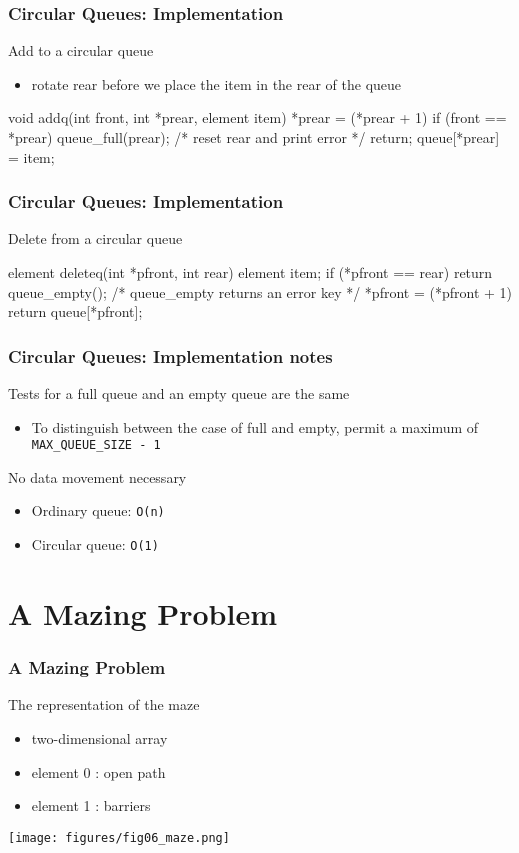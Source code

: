 \documentclass[newPxFont,sthlmFooter,nooffset]{beamer}
\begin{document}
\begin{frame}[t, fragile]
  \frametitle{Circular Queues: Implementation}
Add to a circular queue
\begin{itemize}
\item rotate rear before we place the item in the rear of the queue
\end{itemize}

\begin{ncodedef}
void addq(int front, int *prear, element item){
    *prear = (*prear + 1)  %
    if (front == *prear) {
        queue_full(prear);
            /* reset rear and print error */
        return;
    }
    queue[*prear] = item;
}
\end{ncodedef}
\end{frame}

\begin{frame}[t, fragile]
  \frametitle{Circular Queues: Implementation}
Delete from a circular queue

\begin{ncodedef}
element deleteq(int *pfront, int rear){
    element item;
    if (*pfront == rear)
        return queue_empty();
        /* queue_empty returns an error key */
    *pfront = (*pfront + 1) %
    return queue[*pfront];
}
\end{ncodedef}
\end{frame}

\begin{frame}[t]
  \frametitle{Circular Queues: Implementation notes}
Tests for a full queue and an empty queue are the same
\begin{itemize}
\item To distinguish between the case of full and empty, permit a maximum of \texttt{MAX\_QUEUE\_SIZE - 1}
\end{itemize}
\bigskip
No data movement necessary
\begin{itemize}
\item Ordinary queue: \texttt{O(n)}
\item Circular queue: \texttt{O(1)}
\end{itemize}

\end{frame}

\section{A Mazing Problem}
\begin{frame}[t]
  \frametitle{A Mazing Problem}
The representation of the maze
\begin{itemize}
\item two-dimensional array
\item element 0 : open path
\item element 1 : barriers
\end{itemize}
\texttt{[image: figures/fig06\_maze.png]}
\end{frame}
\end{document}
